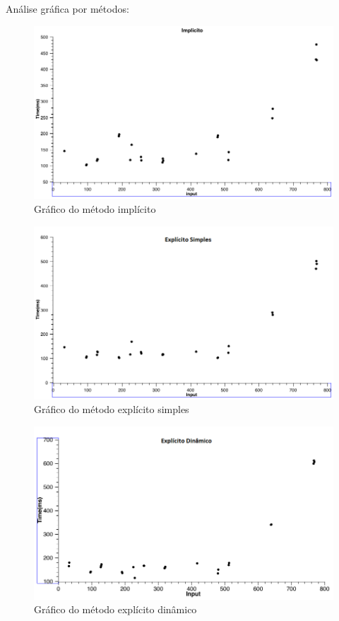\documentclass[a4paper, 10pt]{article}
\begin{document}
Análise gráfica por métodos:
\begin{figure}[!h]
\centering
\includegraphics[scale=0.35]{implicito}
\caption{Gráfico do método implícito}
\label{Gráfico implícito}
\end{figure}
\vspace{3cm}
\begin{figure}[!h]
\centering
\includegraphics[scale=0.35]{explicito_simples}
\caption{Gráfico do método explícito simples}
\label{Gráfico explícito simples}
\end{figure}
\newpage
\begin{figure}[!h]
\centering
\includegraphics[scale=0.35]{explicito_dinamico}
\caption{Gráfico do método explícito dinâmico}
\label{Gráfico explícito dinâmico}
\end{figure}
\end{document}
